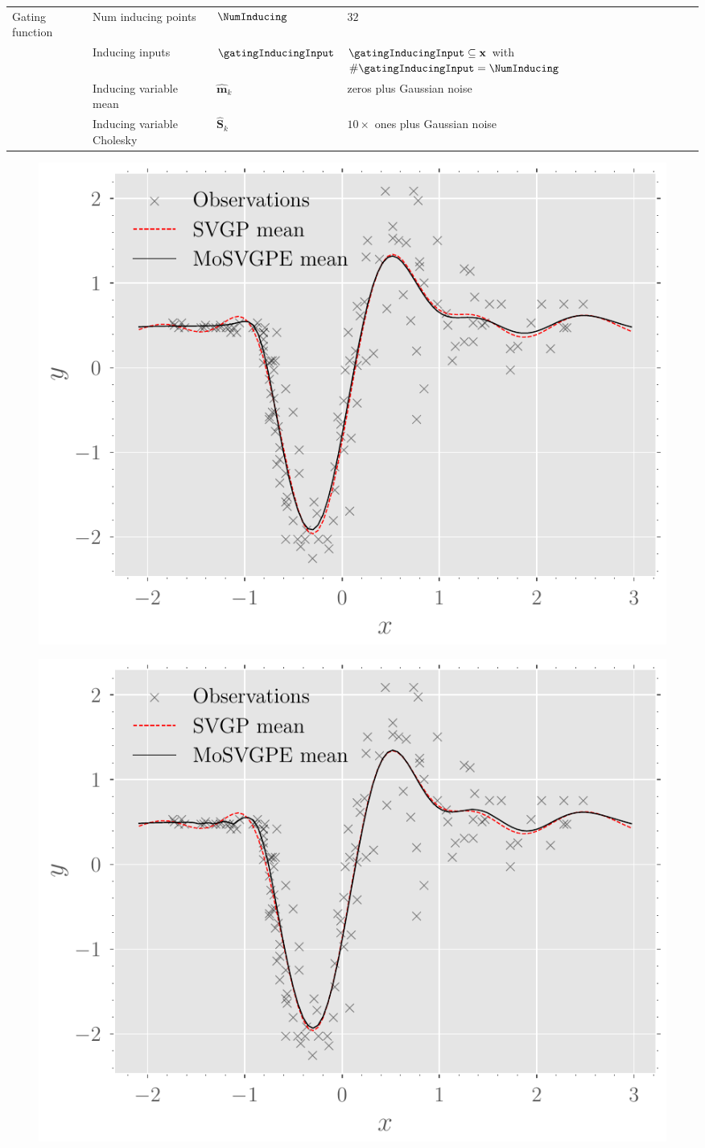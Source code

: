 \documentclass{mimosis-class/mimosis}
\numberwithin{equation}{chapter}
\newcommand{\modeInd}{\ensuremath{k}}
\newcommand{\ModeInd}{\ensuremath{\MakeUppercase{\modeInd}}}
\newcommand{\allData}[1]{\ensuremath{\MakeUppercase{#1}}}
\newcommand{\mode}[1]{\ensuremath{#1_{\modeInd}}}
\newcommand{\x}{\ensuremath{\mathbf{x}}}
\newcommand{\allInput}{\ensuremath{\allData{\x}}}
\begin{document}
{\begin{table}
{\begin{tabular}{llll}
Gating function & Num inducing points & \(\NumInducing\) & \(32\)\\
 & Inducing inputs & \(\gatingInducingInput\) & \(\gatingInducingInput \subseteq \allInput\) with \(\#\gatingInducingInput = \NumInducing\)\\
 & Inducing variable mean & \(\mode{\hat{\mathbf{m}}}\) & zeros plus Gaussian noise\\
 & Inducing variable Cholesky & \(\mode{\hat{\mathbf{S}}}\) & \(10 \times\) ones plus Gaussian noise\\
\hline
\end{tabular}
}
\end{table}
\begin{figure}[hbt!]
\centering
\begin{minipage}[r]{0.49\textwidth}
\includegraphics[width=\textwidth]{./images/model/mcycle/K=2_L2/y_means.pdf}
\label{fig-y-means-mcycle-two-experts-tight}
\end{minipage}
\begin{minipage}[r]{0.49\textwidth}
\includegraphics[width=\textwidth]{./images/model/mcycle/K=2_L3/y_means.pdf}

\end{minipage}
\end{figure}}
\end{document}
